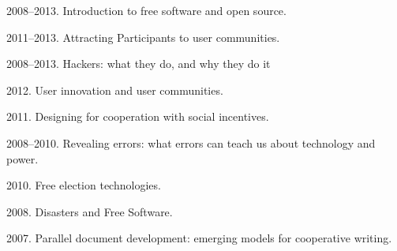 \documentclass[10pt]{article}
\newenvironment{cvlist}{
\begin{list}{}{\leftmargin=3.0em \itemindent=-3.0em}
  \setlength{\itemsep}{0pt}
  \setlength{\parskip}{0em}
  \setlength{\parsep}{1em}
  \setlength{\parindent}{0em}}
{\vspace{1em}
\end{list}}
\begin{document}
\begin{cvlist}

\item 2008--2013. Introduction to free software and open source.
\item 2011--2013. Attracting Participants to user communities.
\item 2008--2013. Hackers: what they do, and why they do it
\item 2012. User innovation and user communities.
\item 2011. Designing for cooperation with social incentives.
\item 2008--2010. Revealing errors: what errors can teach us about technology and power.
\item 2010. Free election technologies.
\item 2008. Disasters and Free Software.
\item 2007. Parallel document development: emerging models for
  cooperative writing.






\end{cvlist}
\end{document}
